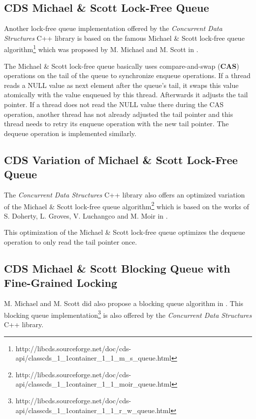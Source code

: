 \subsection[CDS MSQueue]{CDS Michael \& Scott Lock-Free Queue} \label{subsec:cds-ms}

	Another lock-free queue implementation offered by the \textit{Concurrent Data Structures} C++ library is based on the famous Michael \& Scott lock-free queue algorithm\footnote{http://libcds.sourceforge.net/doc/cds-api/classcds\_1\_1container\_1\_1\_m\_s\_queue.html} which was proposed by M. Michael and M. Scott in \cite{Michael:1996}.
	
	The Michael \& Scott lock-free queue basically uses compare-and-swap (\textbf{CAS}) operations on the tail of the queue to synchronize enqueue operations. If a thread reads a NULL value as next element after the queue's tail, it swaps this value atomically with the value enqueued by this thread. Afterwards it adjusts the tail pointer. If a thread does not read the NULL value there during the CAS operation, another thread has not already adjusted the tail pointer and this thread needs to retry its enqueue operation with the new tail pointer. The dequeue operation is implemented similarly.

\subsection[CDS MoirQueue]{CDS Variation of Michael \& Scott Lock-Free Queue} \label{subsec:cds-moir}

	The \textit{Concurrent Data Structures} C++ library also offers an optimized variation of the Michael \& Scott lock-free queue algorithm\footnote{http://libcds.sourceforge.net/doc/cds-api/classcds\_1\_1container\_1\_1\_moir\_queue.html} which is based on the works of S. Doherty, L. Groves, V. Luchangco and M. Moir in \cite{Doherty:2004}.
	
	This optimization of the Michael \& Scott lock-free queue optimizes the dequeue operation to only read the tail pointer once.

\subsection[CDS RWQueue]{CDS Michael \& Scott Blocking Queue with Fine-Grained Locking} \label{subsec:cds-rw}

	M. Michael and M. Scott did also propose a blocking queue algorithm in \cite{Michael:1996}. This blocking queue implementation\footnote{http://libcds.sourceforge.net/doc/cds-api/classcds\_1\_1container\_1\_1\_r\_w\_queue.html} is also offered by the \textit{Concurrent Data Structures} C++ library.
	
